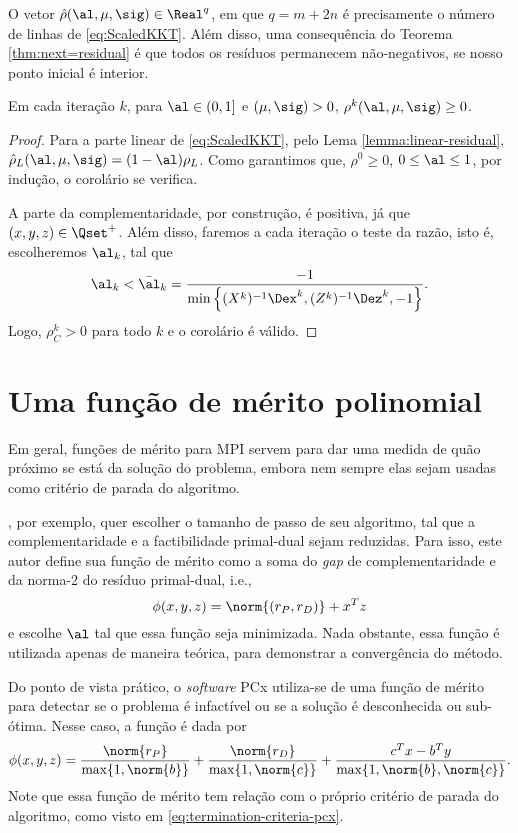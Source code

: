 O vetor  $\hat{\rho}(\al,\mu,\sig) \in \Real^q$, em que  $q = m+2n$ é
precisamente o número de linhas de  \eqref{eq:ScaledKKT}. Além disso, uma
consequência do Teorema \ref{thm:next=residual} é que todos os resíduos
permanecem não-negativos, se nosso ponto inicial é interior. 

\begin{corol}\label{cor:positive-residual}
Em cada iteração $k$, para  $ \al \in(0,1]$ e  $(\mu, \sig)>0$,
$\rho^k(\al,\mu,\sig) \geq 0$.
\end{corol} 
\begin{proof}

Para a parte linear de  \eqref{eq:ScaledKKT}, pelo Lema
\ref{lemma:linear-residual}, $\hat{\rho}_L(\al,\mu,\sig) = (1-\al)\rho_L$. Como
garantimos que, $\rho^0\geq 0$, $0\leq\al\leq1 $, por  indução, o corolário
se verifica.

A parte da complementaridade, por construção,  é positiva, já que 
$(x,y,z)\in\Qset^+$. Além disso, faremos a cada iteração o teste da razão, isto é, escolheremos $\al_k$,
tal que \[ \al_k < \bar{\al}_k = \frac{-1}{\min\left\{
(X^k)^{-1}\Dex^k,(Z^k)^{-1}\Dez^k,-1 \right\}}. \]
Logo, $\rho^k_C>0$ para todo $k$ e o corolário é válido. 
\end{proof}

\section{Uma função de mérito polinomial}


Em geral, funções de mérito para \ac{MPI} servem para dar uma medida de quão
próximo se está da solução do problema, embora nem sempre elas sejam usadas como
critério de parada do algoritmo. 

\citet{Zhang:2006ic}, por exemplo, quer escolher o tamanho de passo de seu
algoritmo, tal que a  complementaridade e a factibilidade primal-dual sejam
reduzidas. Para isso, este autor define sua função de mérito como a soma do
\emph{gap} de complementaridade e da norma-2 do resíduo primal-dual, i.e., \[\phi(x,y,z) =
\norm{(r_P,r_D)} + x^Tz\] e escolhe $\al$ tal que essa função seja minimizada.
Nada obstante, essa função é utilizada apenas de maneira teórica, para
demonstrar a convergência do método.

Do ponto de vista prático, o \emph{software} PCx \cite{Czyzyk:1999hk} utiliza-se de
uma função de mérito para detectar se o problema é infactível ou se a solução é desconhecida
ou sub-ótima. Nesse caso, a função é dada por 
\[
\phi(x,y,z) = \frac{\norm{r_P}}{\max \{1,\norm{b} \} } + \frac{\norm{r_D}}{\max
\{1,\norm{c} \} } + \frac{c^Tx - b^Ty}{\max \{1,\norm{b},\norm{c} \} }.
\]
Note que essa função de mérito tem relação com o próprio critério de parada
do algoritmo, como visto em  \eqref{eq:termination-criteria-pcx}.


